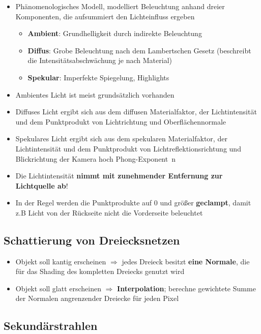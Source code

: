\documentclass[10pt,a4paper]{article}
\begin{document}
	\begin{itemize}
		\item Phänomenologisches Modell, modelliert Beleuchtung anhand dreier Komponenten, die aufsummiert den Lichteinfluss ergeben
		\begin{itemize}
			\item \textbf{Ambient}: Grundhelligkeit durch indirekte Beleuchtung
			\item \textbf{Diffus}: Grobe Beleuchtung nach dem Lambertschen Gesetz (beschreibt die Intensitätsabschwächung je nach Material)
			\item \textbf{Spekular}: Imperfekte Spiegelung, \glqq Highlights\grqq
		\end{itemize}
		\item Ambientes Licht ist meist grundsätzlich vorhanden
		\item Diffuses Licht ergibt sich aus dem diffusen Materialfaktor, der Lichtintensität und dem Punktprodukt von Lichtrichtung und Oberflächennormale
		\item Spekulares Licht ergibt sich aus dem spekularen Materialfaktor, der Lichtintensität und dem Punktprodukt von Lichtreflektionsrichtung und Blickrichtung der Kamera hoch \glqq Phong-Exponent\grqq\ n
		\item Die Lichtintensität \textbf{nimmt mit zunehmender Entfernung zur Lichtquelle ab}!
		\item In der Regel werden die Punktprodukte auf 0 und größer \textbf{\glqq geclampt\grqq}, damit z.B Licht von der Rückseite nicht die Vorderseite beleuchtet
	\end{itemize}

	\subsection{Schattierung von Dreiecksnetzen}
	\label{sub:schattierung_von_dreiecksnetzen}
	
	\begin{itemize}
		\item Objekt soll kantig erscheinen $\Rightarrow$ jedes Dreieck besitzt \textbf{eine Normale}, die für das Shading des kompletten Dreiecks genutzt wird
		\item Objekt soll glatt erscheinen $\Rightarrow$ \textbf{Interpolation}; berechne gewichtete Summe der Normalen angrenzender Dreiecke für jeden Pixel
	\end{itemize}

	\subsection{Sekundärstrahlen}
	\label{sub:sekundaerstrahlen}
	
\end{document}

